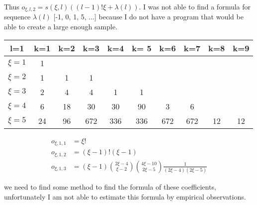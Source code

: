 Thus \(o_{\xi, l, 2} = s(\xi, l)((l-1)!\xi + \lambda(l))\).
I was not able to find a formula for sequence \(\lambda(l)\) 
[-1, 0, 1, 5, ...] because I do not have a program that would 
be able to create a large enough sample.

\begin{table}[h!]
     \centering
     \begin{tabular}{||c| c c c c c c c c c ||} 
          \hline
          \hline
          l=1& k=1 & k=2 & k=3 & k=4 & k= 5 & k=6 & k=7 & k=8 & k=9 \\ [0.5ex] 
          \hline
          \(\xi = 1\) &1 &  & & & & & & & \\
          \(\xi = 2\) &1 & 1 & 1& & & & & & \\
          \(\xi=3\)   &2 & 4 & 4 &1 &1 & & & &  \\
          \(\xi=4\) & 6 & 18 & 30 & 30 & 90 & 3 & 6 & & \\
          \(\xi=5\)  &24 & 96 & 672 & 336 & 336 & 672 & 672 & 12 & 12  \\ [1ex] 
          \hline
          \hline
     \end{tabular}
\end{table}

\begin{align}
    o_{\xi, 1, 1} &= \xi! \\
    o_{\xi, 1, 2} &= (\xi-1)!(\xi-1) \\
    o_{\xi, 1, 3} &= (\xi-1)\binom{2\xi-4}{\xi-2}\binom{4\xi-10}{2\xi-5}\frac{1}{(2\xi-4)(2\xi-5)}
\end{align}

we need to find some method to find the formula of these coefficients, 
unfortunately I am not able to estimate this formula by empirical observations.
